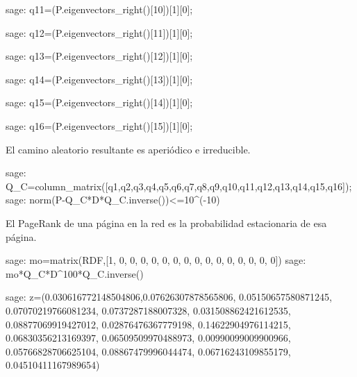 \begin{sagecommandline}
    sage: q11=(P.eigenvectors_right()[10])[1][0];
\end{sagecommandline}

\begin{sagecommandline}
    sage: q12=(P.eigenvectors_right()[11])[1][0];
\end{sagecommandline}

\begin{sagecommandline}
    sage: q13=(P.eigenvectors_right()[12])[1][0];
\end{sagecommandline}

\begin{sagecommandline}
    sage: q14=(P.eigenvectors_right()[13])[1][0];
\end{sagecommandline}

\begin{sagecommandline}
    sage: q15=(P.eigenvectors_right()[14])[1][0];
\end{sagecommandline}

\begin{sagecommandline}
    sage: q16=(P.eigenvectors_right()[15])[1][0];
\end{sagecommandline}

\par El camino aleatorio resultante es aperiódico e irreducible.

\begin{sagecommandline}
    sage: Q_C=column_matrix([q1,q2,q3,q4,q5,q6,q7,q8,q9,q10,q11,q12,q13,q14,q15,q16]);
    sage: norm(P-Q_C*D*Q_C.inverse())<=10^(-10)
\end{sagecommandline}

\par El PageRank de una página en la red es la probabilidad estacionaria de esa página.
    
\begin{sagecommandline}
    sage: mo=matrix(RDF,[1, 0, 0, 0, 0, 0, 0, 0, 0, 0, 0, 0, 0, 0, 0, 0])
    sage: mo*Q_C*D^100*Q_C.inverse()
\end{sagecommandline}

\begin{sagecommandline}
    sage: z=(0.030616772148504806,0.07626307878565806, 0.05150657580871245, 0.07070219766081234, 0.0737287188007328, 0.031508862421612535, 0.08877069919427012, 0.02876476367779198, 0.14622904976114215, 0.06830356213169397, 0.06509509970488973, 0.00990099009900966, 0.05766828706625104, 0.08867479996044474, 0.06716243109855179, 0.04510411167989654)
\end{sagecommandline}

